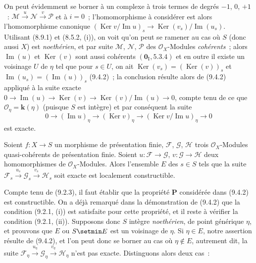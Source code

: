 
On peut évidemment se borner à un complexe à trois termes de degrés
$-1$, $0$, $+1$~:
$\mathcal M\xrightarrow{u}\mathcal N\xrightarrow{v}\mathcal P$
et à $i=0$~; l'homomorphisme à considérer est alors l'homomorphisme canonique
$(\operatorname{Ker}v/\operatorname{Im}u)_s\to
\operatorname{Ker}(v_s)/\operatorname{Im}(u_s)$. Utilisant (8.9.1) et
(8.5.2, (i)), on voit qu'on peut se ramener au cas où $S$ (donc aussi $X$)
est \emph{noethérien}, et par suite $\mathcal M$, $\mathcal N$, $\mathcal P$
des $\mathcal O_X$-Modules \emph{cohérents}~; alors
$\operatorname{Im}(u)$ et $\operatorname{Ker}(v)$ sont aussi cohérents
$(\mathbf 0_{\mathrm I},5.3.4)$ et en outre il existe un voisinage $U$ de
$\eta$ tel que pour $s\in U$, on ait
$\operatorname{Ker}(v_s)=(\operatorname{Ker}(v))_s$ et
$\operatorname{Im}(u_s)=(\operatorname{Im}(u))_s$ (9.4.2)~; la conclusion
résulte alors de (9.4.2) appliqué à la suite exacte
$0\to\operatorname{Im}(u)\to\operatorname{Ker}(v)\to
\operatorname{Ker}(v)/\operatorname{Im}(u)\to0$,
compte tenu de ce que $\mathcal O_\eta=\boldsymbol{k}(\eta)$ (puisque $S$ est intègre) et
par conséquent la suite
\[
0\to(\operatorname{Im}u)_\eta\to(\operatorname{Ker}v)_\eta\to
(\operatorname{Ker}v/\operatorname{Im}u)_\eta\to0
\]
est exacte.

\begin{proposition}[9.4.4]
\label{IV.9.4.4-fr}
Soient $f:X\to S$ un morphisme de présentation finie, $\mathcal F$,
$\mathcal G$, $\mathcal H$ trois $\mathcal O_X$-Modules quasi-cohérents de
présentation finie. Soient $u:\mathcal F\to\mathcal G$,
$v:\mathcal G\to\mathcal H$ deux homomorphismes de $\mathcal O_X$-Modules.
Alors l'ensemble $E$ des $s\in S$ tels que la suite
$\mathcal F_s\xrightarrow{u_s}\mathcal G_s
\xrightarrow{v_s}\mathcal H_s$ soit exacte est localement constructible.
\end{proposition}

Compte tenu de (9.2.3), il faut établir que la propriété $\boldsymbol{P}$ considérée
dans (9.4.2) est constructible. On a déjà remarqué dans la démonstration de
(9.4.2) que la condition (9.2.1, (i)) est satisfaite pour cette propriété, et
il reste à vérifier la condition (9.2.1, (ii)). Supposons donc $S$ intègre
\emph{noethérien}, de point générique $\eta$, et prouvons que $E$ ou $S\setmin E$ est un
voisinage de $\eta$. Si $\eta\in E$, notre assertion résulte de (9.4.2), et
l'on peut donc se borner au cas où $\eta\notin E$, autrement dit, la suite
$\mathcal F_\eta\xrightarrow{u_\eta}\mathcal G_\eta
\xrightarrow{v_\eta}\mathcal H_\eta$ n'est pas exacte. Distinguons alors
deux cas~:

